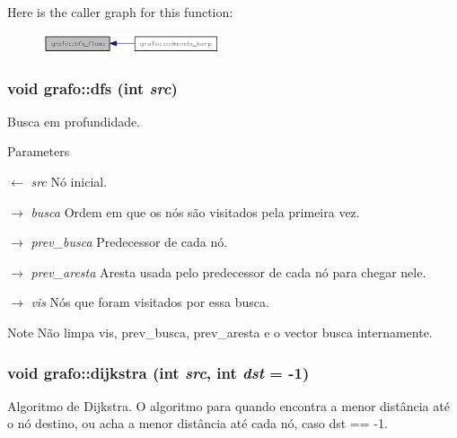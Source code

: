 Here is the caller graph for this function:\nopagebreak
\begin{figure}[H]
\begin{center}
\leavevmode
\includegraphics[width=148pt]{structgrafo_a3ccc56906f3bde5fe92ddd4cdcde1cf4_icgraph}
\end{center}
\end{figure}
\hypertarget{structgrafo_ac221e25487f344b45730a6de4c28a167}{
\subsubsection[{dfs}]{\setlength{\rightskip}{0pt plus 5cm}void grafo::dfs (int {\em src})}}
\label{structgrafo_ac221e25487f344b45730a6de4c28a167}


Busca em profundidade. 
\begin{DoxyParams}{Parameters}
\item[\mbox{$\leftarrow$} {\em src}]Nó inicial. \item[\mbox{$\rightarrow$} {\em busca}]Ordem em que os nós são visitados pela primeira vez. \item[\mbox{$\rightarrow$} {\em prev\_\-busca}]Predecessor de cada nó. \item[\mbox{$\rightarrow$} {\em prev\_\-aresta}]Aresta usada pelo predecessor de cada nó para chegar nele. \item[\mbox{$\rightarrow$} {\em vis}]Nós que foram visitados por essa busca. \end{DoxyParams}
\begin{DoxyNote}{Note}
Não limpa vis, prev\_\-busca, prev\_\-aresta e o vector busca internamente. 
\end{DoxyNote}
\hypertarget{structgrafo_aca0027d6158bf78e948fcde0f1b72cb2}{
\subsubsection[{dijkstra}]{\setlength{\rightskip}{0pt plus 5cm}void grafo::dijkstra (int {\em src}, \/  int {\em dst} = {\ttfamily -\/1})}}
\label{structgrafo_aca0027d6158bf78e948fcde0f1b72cb2}


Algoritmo de Dijkstra. O algoritmo para quando encontra a menor distância até o nó destino, ou acha a menor distância até cada nó, caso dst == -\/1.


